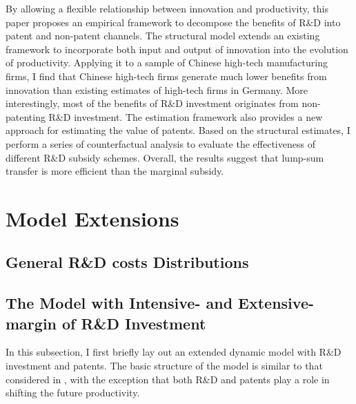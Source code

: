 \documentclass[11pt]{article}
\begin{document}
By allowing a flexible relationship between innovation and productivity, this paper proposes an empirical framework to decompose the benefits of R\&D into patent and non-patent channels. The structural model extends an existing framework to incorporate both input and output of innovation into the evolution of productivity. Applying it to a sample of Chinese high-tech manufacturing firms, I find that Chinese high-tech firms generate much lower benefits from innovation than existing estimates of high-tech firms in Germany. More interestingly, most of the benefits of R\&D investment originates from non-patenting R\&D investment. The estimation framework also provides a new approach for estimating the value of patents. Based on the structural estimates, I perform a series of counterfactual analysis to evaluate the effectiveness of different R\&D subsidy schemes. Overall, the results suggest that lump-sum transfer is more efficient than the marginal subsidy. 



\clearpage 
\setcounter{equation}{0}
\renewcommand{\theequation}{A.\arabic{equation}}
\appendix 
\appendixpage 
\section{Model Extensions}


\subsection{General R\&D costs Distributions} \label{gen_rdDist}

\subsection{The Model with Intensive- and Extensive-margin of R\&D Investment} 
In this subsection, I first briefly lay out an extended dynamic model with R\&D investment and patents. The basic structure of the model is similar to that considered in \cite{Awetal.2011,Doraszelski2013,Peters2016, Peters2017rand}, with the exception that both R\&D and patents play a role in shifting the future productivity. 
\end{document}
